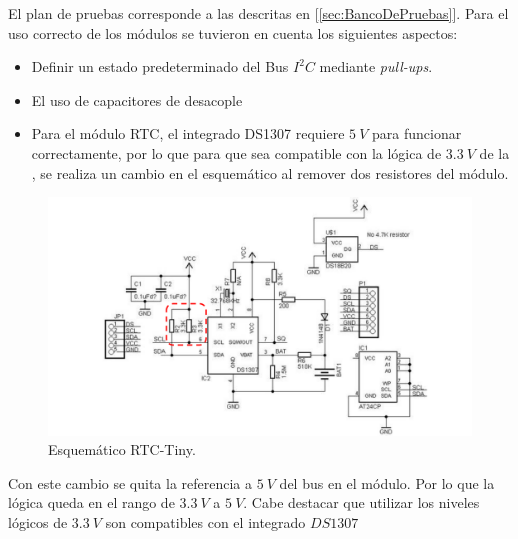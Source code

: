 El plan de pruebas corresponde a las descritas en [\ref{sec:BancoDePruebas}].
Para el uso correcto de los módulos se tuvieron en cuenta los siguientes aspectos:
\begin{itemize}
	\item Definir un estado predeterminado del Bus $I^2C$ mediante \textit{pull-ups}.
	\item El uso de capacitores de desacople
	\item Para el módulo RTC, el integrado DS1307 requiere $5 \ V$ para funcionar correctamente, por lo que para que sea compatible con la lógica de $3.3 \ V$ de la \rspi, se realiza un cambio en el esquemático al remover dos resistores del módulo.
\end{itemize}

\begin{figure}[H]
	\centering
	\includegraphics[width=0.9\linewidth,page=1]{ImagenesIngenieria de detalle/rtcTinySchematic}
	\caption{Esquemático RTC-Tiny.}
	\label{fig:RTCSchematic}
\end{figure}

Con este cambio se quita la referencia a $5 \ V$ del bus en el módulo. Por lo que la lógica queda en el rango de $3.3 \ V$ a $5 \ V$. Cabe destacar que utilizar los niveles lógicos de $3.3 \ V$ son compatibles con el integrado $DS1307$


